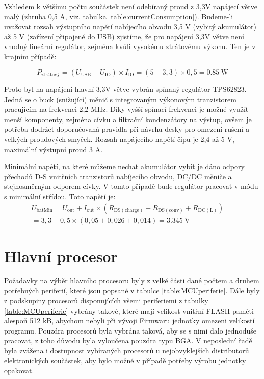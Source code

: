 

Vzhledem k většímu počtu součástek není odebíraný proud z 3,3V napájecí větve malý (zhruba 0,5 A, viz. tabulka \ref{table:currentConsumption}). Budeme-li uvažovat rozsah výstupního napětí nabíjecího obvodu 3,5 V (vybitý akumulátor) až 5 V (zařízení připojené do USB) zjistíme, že pro napájení 3,3V větve není vhodný lineární regulátor, zejména kvůli vysokému ztrátovému výkonu. Ten je v krajním případě:

\begin{equation}
P_{\mathrm{ztrátový}} = (U_{\mathrm{USB}}-U_{\mathrm{IO}})\times I_{\mathrm{IO}}=(5-3,3)\times 0,5= \SI{0,85}{\watt}
\end{equation}

Proto byl na napájení hlavní 3,3V větve vybrán spínaný regulátor TPS62823. Jedná se o buck (snižující) měnič s integrovaným výkonovým tranzistorem pracujícím na frekvenci 2,2 MHz. Díky vyšší spínací frekvenci je možné využít menší komponenty, zejména cívku a filtrační kondenzátory na výstup, ovšem je potřeba dodržet doporučovaná pravidla při návrhu desky pro omezení rušení a velkých proudových smyček. Rozsah napájecího napětí čipu je 2,4 až 5 V, maximální výstupní proud 3 A. \cite{mGnys3WmOkWuaQHN}

Minimální napětí, na které můžeme nechat akumulátor vybít je dáno odpory přechodů D-S vnitřních tranzistorů nabíjecího obvodu, DC/DC měniče a stejnosměrným odporem cívky. V tomto případě bude regulátor pracovat v módu s minimální střídou. \cite{mGnys3WmOkWuaQHN} Toto napětí je:
\begin{equation}
\begin{matrix}
 U_{\mathrm{batMin}} = U_{\mathrm{out}} + I_{\mathrm{out}} \times (R_{\mathrm{DS(charge)}} + R_{\mathrm{DS(conv)}} + R_{\mathrm{DC(L)}})= \\
  =3,3 + 0,5 \times (0,05 + 0,026 + 0,014) = \SI{3,345}{\volt}
\end{matrix}
 \end{equation}

\section{Hlavní procesor}
Požadavky na výběr hlavního procesoru byly z velké části dané počtem a druhem potřebných periferií, které jsou popsané v tabulce \ref{table:MCUperiferie}.
Dále byly z podskupiny procesorů disponujících všemi periferiemi z tabulky \ref{table:MCUperiferie} vybrány takové, které mají velikost vnitřní FLASH paměti alespoň 512 kB, abychom nebyli při vývoji Firmwaru jednotky omezeni velikostí programu. Pouzdra procesorů byla vybrána taková, aby se s nimi dalo jednoduše pracovat, z toho důvodu byla vyloučena pouzdra typu BGA. 
V neposlední řadě byla zvážena i dostupnost vybíraných procesorů u nejobvyklejších distributorů elektronických součástek, aby bylo možné v případě potřeby výrobu jednotky opakovat.

